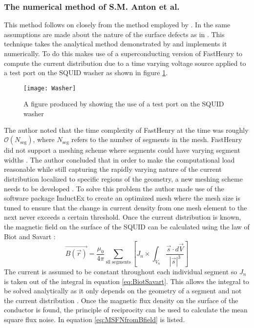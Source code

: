 \subsubsection*{The numerical method of S.M. Anton et al.}
This method follows on closely from the method employed by \cite{KochModel}. In \cite{fluxNoiseSquidsStevenAnton} the same assumptions are made about the nature of the surface defects as in \cite{KochModel}. This technique takes the analytical method demonstrated by \cite{KochModel} and implements it numerically. To do this \cite{fluxNoiseSquidsStevenAnton} makes use of a superconducting version of FastHenry to compute the current distribution due to a time varying voltage source applied to a test port on the SQUID washer as shown in figure \ref{fig:WASHERSteven}.
\begin{figure}[h]
    \centering
    \texttt{[image: Washer]}
    \caption{A figure produced by \cite{fluxNoiseSquidsStevenAnton} showing the use of a test port on the SQUID washer}
    \label{fig:WASHERSteven}
\end{figure}
The author noted that the time complexity of FastHenry at the time was roughly $\mathcal{O}(N_{\text{seg}})$, where $N_{\text{seg}}$ refers to the number of segments in the mesh. FastHenry did not support a meshing scheme where segments could have varying segment widths \cite{fluxNoiseSquidsStevenAnton}. The author concluded that in order to make the computational load reasonable while still capturing the rapidly varying nature of the current distribution localized to specific regions of the geometry, a new meshing scheme needs to be developed \cite{fluxNoiseSquidsStevenAnton}. To solve this problem the author made use of the software package InductEx to create an optimized mesh where the mesh size is tuned to ensure that the change in current density from one mesh element to the next never exceeds a certain threshold. Once the current distribution is known, the magnetic field on the surface of the SQUID can be calculated using the law of Biot and Savart \cite{fluxNoiseSquidsStevenAnton}:
\begin{equation}
    \Vec{B(\Vec{r})} = \frac{\mu_0}{4\pi}\sum_{\text{sll segments}}[J_n\times\int_{V_n}\frac{\Vec{s}\cdot d\Vec{V}}{|\Vec{s}|^3}]
    \label{eq:BiotSavart}
\end{equation}
The current is assumed to be constant throughout each individual segment so $J_n$ is taken out of the integral in equation \ref{eq:BiotSavart}. This allows the integral to be solved analytically as it only depends on the geometry of a segment and not the current distribution \cite{fluxNoiseSquidsStevenAnton}. Once the magnetic flux density on the surface of the conductor is found, the principle of reciprocity can be used to calculate the mean square flux noise. In \cite{fluxNoiseSquidsStevenAnton} equation \ref{eq:MSFNfromBfield} is listed.
